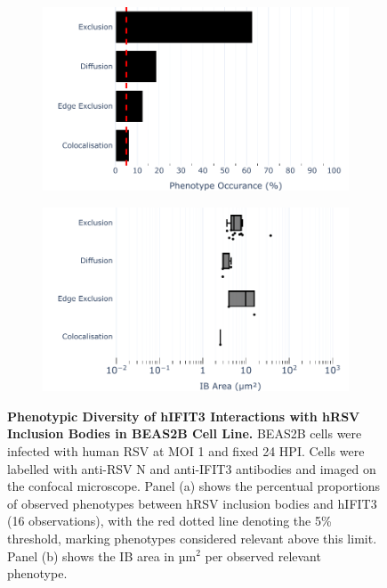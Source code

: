 \begin{figure}
    \begin{subfigure}{0.495\textwidth}
        \caption{}
        \includegraphics[width=1\linewidth]{08. Chapter 3/Figs/02. Infection/03. IFIT3/04. bar_i3_beas2b.pdf} 
    \end{subfigure}
    \begin{subfigure}{0.495\textwidth}
        \caption{}        
        \includegraphics[width=1\linewidth]{08. Chapter 3/Figs/02. Infection/03. IFIT3/05. box_i3_beas2b.pdf}
    \end{subfigure}
    \caption[Phenotypic Diversity of hIFIT3 Interactions with hRSV Inclusion Bodies in BEAS2B Cell Line.]{\textbf{Phenotypic Diversity of hIFIT3 Interactions with hRSV Inclusion Bodies in BEAS2B Cell Line.} BEAS2B cells were infected with human RSV at MOI 1 and fixed 24 HPI. Cells were labelled with anti-RSV N and anti-IFIT3 antibodies and imaged on the confocal microscope. Panel (a) shows the percentual proportions of observed phenotypes between hRSV inclusion bodies and hIFIT3 (16 observations), with the red dotted line denoting the 5\% threshold, marking phenotypes considered relevant above this limit. Panel (b) shows the IB area in \(\mbox{µm}^2\) per observed relevant phenotype.}
    \label{fig:Phenotypic Diversity of hIFIT3 Interactions with hRSV Inclusion Bodies in BEAS2B Cell Line}
\end{figure}

